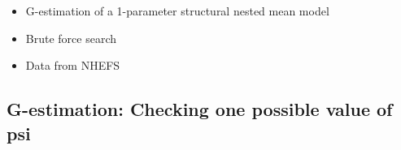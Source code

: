 \documentclass[
  10pt,
  a4paper,
]{book}
\newenvironment{Shaded}{\begin{snugshade}}{\end{snugshade}}
\newcommand{\CommentTok}[1]{\textcolor[rgb]{0.37,0.37,0.37}{#1}}
\newcommand{\FloatTok}[1]{\textcolor[rgb]{0.68,0.00,0.00}{#1}}
\newcommand{\FunctionTok}[1]{\textcolor[rgb]{0.28,0.35,0.67}{#1}}
\newcommand{\NormalTok}[1]{\textcolor[rgb]{0.00,0.46,0.62}{#1}}
\newcommand{\OtherTok}[1]{\textcolor[rgb]{0.00,0.46,0.62}{#1}}
\newcommand{\SpecialCharTok}[1]{\textcolor[rgb]{0.37,0.37,0.37}{#1}}
\newcommand{\StringTok}[1]{\textcolor[rgb]{0.13,0.47,0.30}{#1}}
\providecommand{\tightlist}{%
  \setlength{\itemsep}{0pt}\setlength{\parskip}{0pt}}
\begin{document}
\begin{itemize}
\tightlist
\item
  G-estimation of a 1-parameter structural nested mean model
\item
  Brute force search
\item
  Data from NHEFS
\end{itemize}

\hypertarget{g-estimation-checking-one-possible-value-of-psi}{%
\subsection{G-estimation: Checking one possible value of psi}\label{g-estimation-checking-one-possible-value-of-psi}}

\begin{Shaded}
\end{Shaded}
\end{document}
